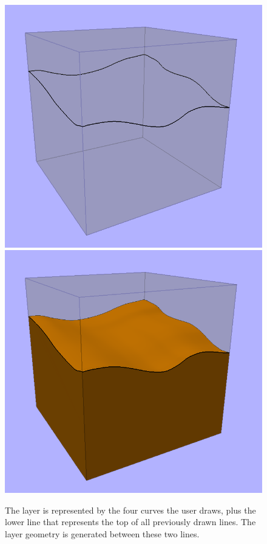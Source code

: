 \documentclass[a4paper,12pt]{report}
\begin{document}
\begin{figure}
\includegraphics[width=.5\linewidth]{thesis/results/simpleLayerDraw.png}
\includegraphics[width=.5\linewidth]{thesis/results/simpleLayerCreate.png}
 \caption{The layer is represented by the four curves the user draws, plus the lower line that represents the top of all previously drawn lines. The layer geometry is generated between these two lines.}
 \label{fig:layerCreate}
\end{figure}
\end{document}
